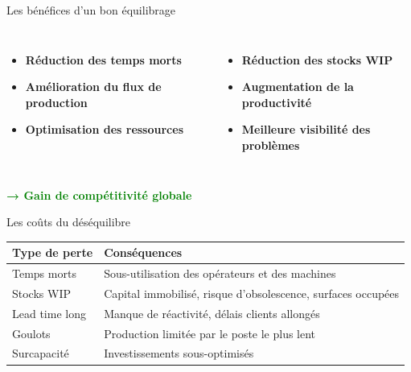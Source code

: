 \documentclass{beamer}
\begin{document}
\begin{frame}{Les bénéfices d'un bon équilibrage}
    \begin{columns}
        \begin{itemize}
            \item \textbf{Réduction des temps morts}
            \item \textbf{Amélioration du flux de production}
            \item \textbf{Optimisation des ressources}
        \end{itemize}
        
        \begin{itemize}
            \item \textbf{Réduction des stocks WIP}
            \item \textbf{Augmentation de la productivité}
            \item \textbf{Meilleure visibilité des problèmes}
        \end{itemize}
    \end{columns}
    
    \vspace{0.5cm}
    \begin{center}
        \textcolor{green}{\textbf{→ Gain de compétitivité globale}}
    \end{center}
\end{frame}

\begin{frame}{Les coûts du déséquilibre}
    \begin{table}[H]
    \centering
    \begin{tabular}{|p{3cm}|p{7cm}|}
    \hline
    \textbf{Type de perte} & \textbf{Conséquences} \\
    \hline
    Temps morts & Sous-utilisation des opérateurs et des machines \\
    \hline
    Stocks WIP & Capital immobilisé, risque d'obsolescence, surfaces occupées \\
    \hline
    Lead time long & Manque de réactivité, délais clients allongés \\
    \hline
    Goulots & Production limitée par le poste le plus lent \\
    \hline
    Surcapacité & Investissements sous-optimisés \\
    \hline
    \end{tabular}
    \end{table}
\end{frame}
\end{document}
